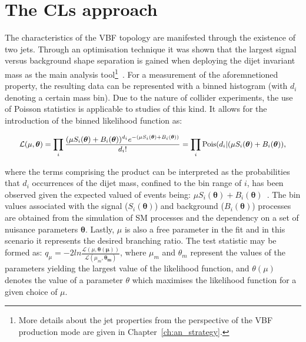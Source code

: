 \section{The CLs approach}

\hspace{10pt} The characteristics of the VBF topology are manifested through the existence of two jets. Through an optimisation technique it was shown that the largest signal versus background shape separation is gained when deploying the dijet invariant mass as the main analysis tool\footnote{More details about the jet properties from the perspective of the VBF production mode are given in Chapter~\ref{ch:an_strategy}.}~\cite{paper:HIG_17_023,Riccardo}. For a measurement of the aforemnetioned property, the resulting data can be represented with a binned histogram (with $d_i$ denoting a certain mass bin). Due to the nature of collider experiments, the use of Poisson statistics is applicable to studies of this kind. It allows for the introduction of the binned likelihood function as:

\begin{equation}
   \small{\mathcal{L}(\mu, \boldsymbol{\theta}) = \prod_i \frac{(\mu S_i(\boldsymbol{\theta})+B_i(\boldsymbol{\theta}))^{d_i}e^{-(\mu S_i(\boldsymbol{\theta})+B_i(\boldsymbol{\theta}))}}{d_i!} = \prod_i \text{Pois}(d_i|(\mu S_i(\boldsymbol{\theta})+B_i(\boldsymbol{\theta})),}
    \label{eq:likelihood_def}
\end{equation}

where the terms comprising the product can be interpreted as the probabilities that $d_i$ occurrences of the dijet mass, confined to the bin range of $i$, has been observed given the expected valued of events being: $\mu S_i(\boldsymbol{\theta})+B_i(\boldsymbol{\theta})$~\cite{paper:stat_overview,paper:cls_intro}. The bin values associated with the signal ($S_i(\boldsymbol{\theta})$) and background ($B_i(\boldsymbol{\theta})$) processes are obtained from the simulation of SM processes and the dependency on a set of nuisance parameters $\boldsymbol{\theta}$. Lastly, $\mu$ is also a free parameter in the fit and in this scenario it represents the desired branching ratio. The test statistic may be formed as: $q_\mu = -2ln\frac{\mathcal{L}(\mu, \boldsymbol{\theta(\mu)})}{\mathcal{L}(\mu_m, \boldsymbol{\theta_m})}$, where $\mu_m$ and $\theta_m$ represent the values of the parameters yielding the largest value of the likelihood function, and $\theta(\mu)$ denotes the value of a parameter $\theta$ which maximises the likelihood function for a given choice of $\mu$. 

